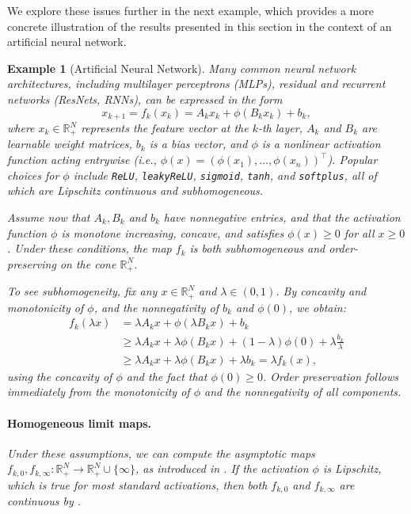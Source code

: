 \documentclass{article}
\newtheorem{example}[theorem]{Example}
\newcommand{\R}{\mathbb{R}}
\begin{document}
We explore these issues further in the next example, which provides a more concrete illustration of the results presented in this section in the context of an artificial neural network.





\begin{example}[Artificial Neural Network]\label{ex:ANN_subhomogeneous}
Many common neural network architectures, including multilayer perceptrons (MLPs),  residual and recurrent networks (ResNets, RNNs), can be expressed in the form
\begin{equation}
    x_{k+1} = f_k(x_k) = A_k x_k + \phi(B_k x_k) + b_k,
\end{equation}
where $x_k \in \R_+^N$ represents the feature vector at the $k$-th layer, $A_k$ and $B_k$ are learnable weight matrices, $b_k$ is a bias vector, and $\phi$ is a nonlinear activation function acting entrywise (i.e., $\phi(x) = (\phi(x_1), \dots, \phi(x_n))^\top$). Popular choices for $\phi$ include \texttt{ReLU}, \texttt{leakyReLU}, \texttt{sigmoid}, \texttt{tanh}, and \texttt{softplus}, all of which are Lipschitz continuous and subhomogeneous.

Assume now that $A_k, B_k$ and $b_k$ have nonnegative entries, and that the activation function $\phi$ is monotone increasing, concave, and satisfies $\phi(x) \geq 0$ for all $x \geq 0$. Under these conditions, the map $f_k$ is both subhomogeneous and order-preserving on the cone $\R_+^N$.

To see subhomogeneity, fix any $x \in \R_+^N$ and $\lambda \in (0,1)$. By concavity and monotonicity of $\phi$, and the nonnegativity of $b_k$ and $\phi(0)$, we obtain:
\begin{equation}
\begin{aligned}
    f_k(\lambda x) &= \lambda A_k x + \phi(\lambda B_k x) + b_k \\
    &\geq \lambda A_k x + \lambda \phi(B_k x) + (1 - \lambda) \phi(0) + \lambda \frac{b_k}{\lambda} \\
    &\geq \lambda A_k x + \lambda \phi(B_k x) + \lambda b_k = \lambda f_k(x),
\end{aligned}
\end{equation}
using the concavity of $\phi$ and the fact that $\phi(0) \geq 0$. Order preservation follows immediately from the monotonicity of $\phi$ and the nonnegativity of all components.

\paragraph{Homogeneous limit maps.}
Under these assumptions, we can compute the asymptotic maps $f_{k,0}, f_{k,\infty} : \R_+^N \to \R_+^N \cup \{\infty\}$, as introduced in . If the activation $\phi$ is Lipschitz, which is true for most standard activations, then both $f_{k,0}$ and $f_{k,\infty}$ are continuous by .


\end{example}
\end{document}
